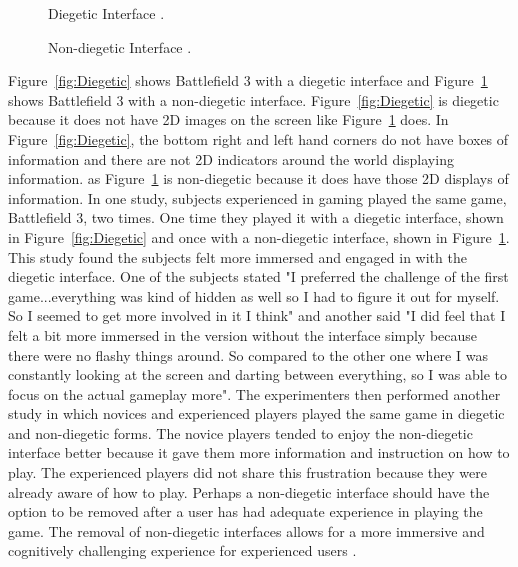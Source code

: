 \begin{figure}[!ht]
	\begin{minipage}[!ht]{6cm}
		\par
		\caption{Diegetic Interface \cite{Iacovides2015}.}
		\label{fig:Diegetic}
	\end{minipage}
	\hfill
	\begin{minipage}[!ht]{6cm}
		\par
		\caption{Non-diegetic Interface \cite{Iacovides2015}.}
		\label{fig:Non-Diegetic}
	\end{minipage}
\end{figure}Figure~\ref{fig:Diegetic} shows Battlefield 3 with a diegetic interface and Figure~\ref{fig:Non-Diegetic} shows Battlefield 3 with a non-diegetic interface. Figure~\ref{fig:Diegetic} is diegetic because it does not have 2D images on the screen like Figure~\ref{fig:Non-Diegetic} does. In Figure~\ref{fig:Diegetic}, the bottom right and left hand corners do not have boxes of information and there are not 2D indicators around the world displaying information. as Figure~\ref{fig:Non-Diegetic} is non-diegetic because it does have those 2D displays of information. In one study, subjects experienced in gaming played the same game, Battlefield 3, two times. One time they played it with a diegetic interface, shown in Figure~\ref{fig:Diegetic} and once with a non-diegetic interface, shown in Figure~\ref{fig:Non-Diegetic}. This study found the subjects felt more immersed and engaged in with the diegetic interface. One of the subjects stated "I preferred the challenge of the first game...everything was kind of hidden as well so I had to figure it out for myself. So I seemed to get more involved in it I think" \cite{Iacovides2015} and another said "I did feel that I felt a bit more immersed in the version without the interface simply because there were no flashy things around. So compared to the other one where I was constantly looking at the screen and darting between everything, so I was able to focus on the actual gameplay more". \cite{Iacovides2015} The experimenters then performed another study in which novices and experienced players played the same game in diegetic and non-diegetic forms. The novice players tended to enjoy the non-diegetic interface better because it gave them more information and instruction on how to play. The experienced players did not share this frustration because they were already aware of how to play. Perhaps a non-diegetic interface should have the option to be removed after a user has had adequate experience in playing the game. The removal of non-diegetic interfaces allows for a more immersive and cognitively challenging experience for experienced users \cite{Iacovides2015}. 


